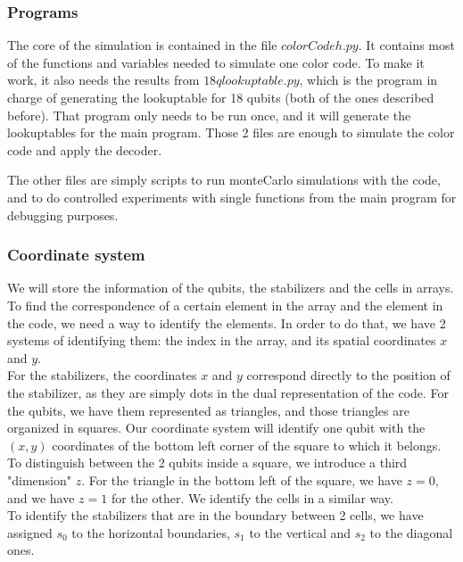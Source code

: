 \documentclass[a4paper,12pt]{article}
\begin{document}
\subsubsection{Programs}

The core of the simulation is contained in the file $colorCodeh.py$. It contains most of the functions and variables needed to simulate one color code. To make it work, it also needs the results from $18qlookuptable.py$, which is the program in charge of generating the lookuptable for 18 qubits (both of the ones described before). That program only needs to be run once, and it will generate the lookuptables for the main program. Those 2 files are enough to simulate the color code and apply the decoder.

The other files are simply scripts to run monteCarlo simulations with the code, and to do controlled experiments with single functions from the main program for debugging purposes. 


\subsubsection{Coordinate system}

We will store the information of the qubits, the stabilizers and the cells in arrays. To find the correspondence of a certain element in the array and the element in the code, we need a way to identify the elements. In order to do that, we have 2 systems of identifying them: the index in the array, and its spatial coordinates $x$ and $y$. \\

For the stabilizers, the coordinates $x$ and $y$ correspond directly to the position of the stabilizer, as they are simply dots in the dual representation of the code. For the qubits, we have them represented as triangles, and those triangles are organized in squares. Our coordinate system will identify one qubit with the $(x,y)$ coordinates of the bottom left corner of the square to which it belongs. To distinguish between the 2 qubits inside a square, we introduce a third "dimension" $z$. For the triangle in the bottom left of the square, we have $z=0$, and we have $z=1$ for the other. We identify the cells in a similar way.\\

To identify the stabilizers that are in the boundary between 2 cells, we have assigned $s_0$ to the horizontal boundaries, $s_1$ to the vertical and $s_2$ to the diagonal ones.\\
\end{document}
